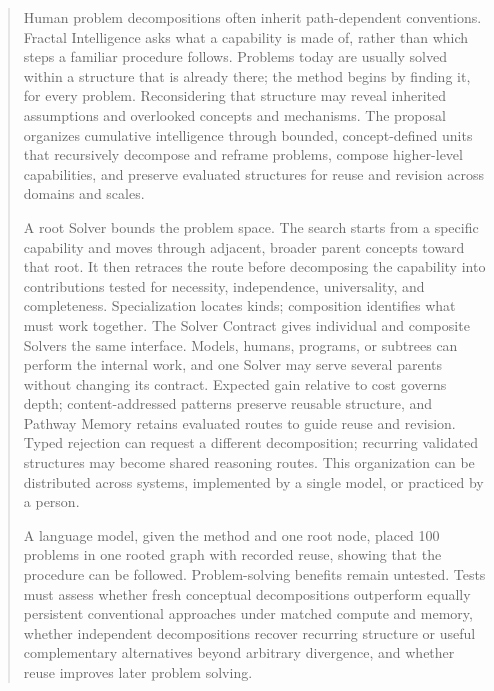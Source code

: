 \documentclass[11pt]{article}
\author{Henrik Westerberg\\
\small{henrik.westerberg@emergentwisdom.org}}
\begin{document}
\maketitle

\begin{abstract}
\noindent Human problem decompositions often inherit path-dependent conventions. Fractal Intelligence asks what a capability is made of, rather than which steps a familiar procedure follows. Problems today are usually solved within a structure that is already there; the method begins by finding it, for every problem. Reconsidering that structure may reveal inherited assumptions and overlooked concepts and mechanisms. The proposal organizes cumulative intelligence through bounded, concept-defined units that recursively decompose and reframe problems, compose higher-level capabilities, and preserve evaluated structures for reuse and revision across domains and scales.

A root Solver bounds the problem space. The search starts from a specific capability and moves through adjacent, broader parent concepts toward that root. It then retraces the route before decomposing the capability into contributions tested for necessity, independence, universality, and completeness. Specialization locates kinds; composition identifies what must work together. The Solver Contract gives individual and composite Solvers the same interface. Models, humans, programs, or subtrees can perform the internal work, and one Solver may serve several parents without changing its contract. Expected gain relative to cost governs depth; content-addressed patterns preserve reusable structure, and Pathway Memory retains evaluated routes to guide reuse and revision. Typed rejection can request a different decomposition; recurring validated structures may become shared reasoning routes. This organization can be distributed across systems, implemented by a single model, or practiced by a person.

A language model, given the method and one root node, placed 100 problems in one rooted graph with recorded reuse, showing that the procedure can be followed. Problem-solving benefits remain untested. Tests must assess whether fresh conceptual decompositions outperform equally persistent conventional approaches under matched compute and memory, whether independent decompositions recover recurring structure or useful complementary alternatives beyond arbitrary divergence, and whether reuse improves later problem solving.
\end{abstract}
\end{document}
